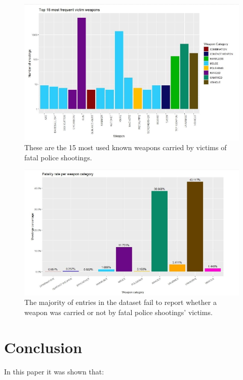 \documentclass[11pt, journal]{IEEEtran}
\begin{document}
\begin{figure}[htb]
	\centering
		\includegraphics[width=1.0\columnwidth]{images/snapshot9}
	\caption{These are the 15 most used known weapons carried by victims of fatal police shootings.}
	\label{fig:probov}
\end{figure}

\begin{figure}[htb]
	\centering
		\includegraphics[width=1.0\columnwidth]{images/snapshot10}
	\caption{The majority of entries in the dataset fail to report whether a weapon was carried or not by fatal police shootings’ victims.}
	\label{fig:probov}
\end{figure}


\section{Conclusion} \label{sec:concl}
In this paper it was shown that:
\end{document}
